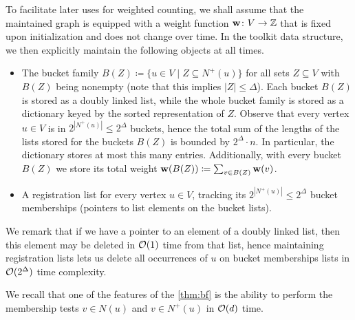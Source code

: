 To facilitate later uses for weighted counting,
we shall assume that the maintained graph is equipped with a weight function $\mathbf{w}\colon V\to \mathbb{Z}$ that is fixed upon initialization and does not change over time. In the toolkit data structure, we then explicitly maintain the following objects at all times.
\begin{itemize}
\item The bucket family $B(Z)\coloneqq \{u\in V \mid Z\subseteq N^+(u)\}$ for all sets $Z\subseteq V$ with $B(Z)$ being nonempty (note that this implies $|Z|\leq \Delta$). Each bucket $B(Z)$ is stored as a doubly linked list, while the whole bucket family is stored as a dictionary keyed by the sorted representation of $Z$. Observe that every vertex $u\in V$ is in $2^{|N^+(u)|}\leq 2^\Delta$ buckets, hence the total sum of the lengths of the lists stored for the buckets $B(Z)$ is bounded by $2^\Delta\cdot n$. In particular, the dictionary stores at most this many entries. Additionally, with every bucket $B(Z)$ we store its total weight $\mathbf{w}(B(Z))\coloneqq \sum_{v\in B(Z)}\mathbf{w}(v)$.
\item A registration list for every vertex $u \in V$, tracking its $2^{|N^+(u)|} \le 2^\Delta$ bucket memberships (pointers to list elements on the bucket lists).
\end{itemize}
We remark that if we have a pointer to an element of a doubly linked list, then this element may be deleted in $\mathcal{O}(1)$ time from that list, hence maintaining registration lists lets us delete all occurrences of $u$ on bucket memberships lists in $\mathcal{O}(2^{\Delta})$ time complexity.

We recall that one of the features of the \cref{thm:bf} is the ability to perform the membership tests $v\in N(u)$ and $v\in N^+(u)$ in $\mathcal{O}(d)$ time.

